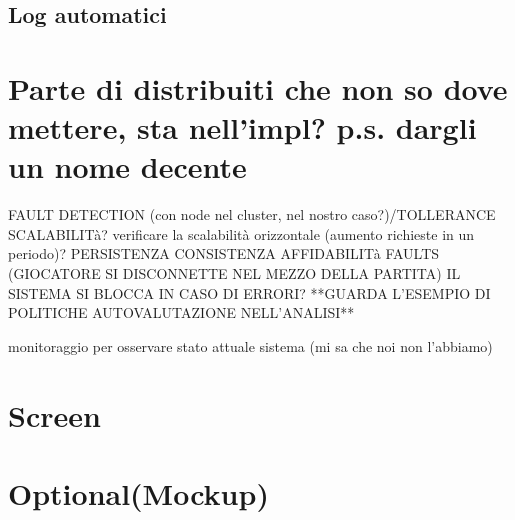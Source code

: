 \subsection{Log automatici}


\section{Parte di distribuiti che non so dove mettere, sta nell'impl? p.s. dargli un nome decente}
FAULT DETECTION (con node nel cluster, nel nostro caso?)/TOLLERANCE
SCALABILITà?
verificare la scalabilità orizzontale (aumento richieste in un periodo)?
PERSISTENZA
CONSISTENZA
AFFIDABILITà
FAULTS (GIOCATORE SI DISCONNETTE NEL MEZZO DELLA PARTITA)
IL SISTEMA SI BLOCCA IN CASO DI ERRORI?
**GUARDA L'ESEMPIO DI POLITICHE AUTOVALUTAZIONE NELL'ANALISI**

monitoraggio per osservare stato attuale sistema (mi sa che noi non l'abbiamo)
\section{Screen}
\section{Optional(Mockup)}





